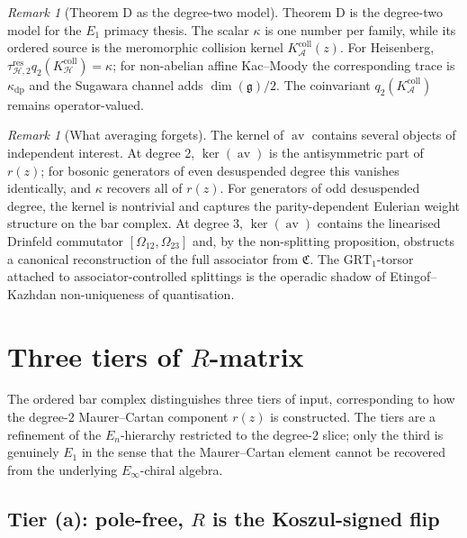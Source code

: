 \documentclass[11pt,reqno]{amsart}
\theoremstyle{definition}
\theoremstyle{remark}
\newtheorem{remark}[theorem]{Remark}
\newcommand{\cA}{\mathcal{A}}
\newcommand{\cH}{\mathcal{H}}
\newcommand{\fg}{\mathfrak{g}}
\newcommand{\av}{\operatorname{av}}
\newcommand{\GRT}{\mathrm{GRT}}
\numberwithin{equation}{section}
\begin{document}
\begin{remark}[Theorem D as the degree-two model]
\label{rem:theorem-d-degree-two-model}
Theorem D is the degree-two model for the $E_1$ primacy thesis.
The scalar $\kappa$ is one number per family, while its ordered source
is the meromorphic collision kernel $K_\cA^{\mathrm{coll}}(z)$.  For
Heisenberg,
$\tau_{\cH,2}^{\mathrm{res}}q_2(K_\cH^{\mathrm{coll}})=\kappa$; for
non-abelian affine Kac--Moody the corresponding trace is
$\kappa_{\mathrm{dp}}$ and the Sugawara channel adds $\dim(\fg)/2$.
The coinvariant $q_2(K_\cA^{\mathrm{coll}})$ remains operator-valued.
\end{remark}

\begin{remark}[What averaging forgets]
\label{rem:what-av-forgets}
The kernel of $\av$ contains several objects of independent
interest. At degree $2$, $\ker(\av)$ is the antisymmetric part of
$r(z)$; for bosonic generators of even desuspended degree this
vanishes identically, and $\kappa$ recovers all of $r(z)$. For
generators of odd desuspended degree, the kernel is nontrivial
and captures the parity-dependent Eulerian weight structure
on the bar complex. At degree $3$, $\ker(\av)$ contains the
linearised Drinfeld commutator $[\Omega_{12},\Omega_{23}]$ and,
by the non-splitting proposition, obstructs a canonical
reconstruction of the full associator from $\mathfrak{C}$.
The $\GRT_{1}$-torsor attached to associator-controlled splittings
is the operadic shadow of Etingof--Kazhdan non-uniqueness of
quantisation.
\end{remark}

\section{Three tiers of \texorpdfstring{$R$}{R}-matrix}
\label{sec:three-tiers}

The ordered bar complex distinguishes three tiers of input,
corresponding to how the degree-$2$ Maurer--Cartan component
$r(z)$ is constructed. The tiers are a refinement of the
$E_{n}$-hierarchy restricted to the degree-$2$ slice; only the
third is genuinely $E_{1}$ in the sense that the Maurer--Cartan
element cannot be recovered from the underlying
$E_{\infty}$-chiral algebra.

\subsection*{Tier (a): pole-free, $R$ is the Koszul-signed flip}
\end{document}
